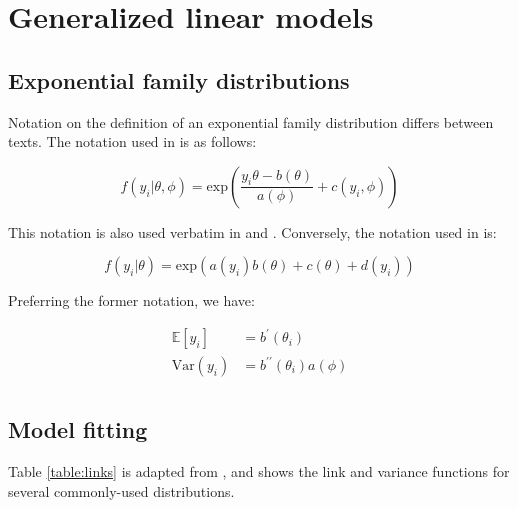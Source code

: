 \documentclass{report}
\begin{document}
\section{Generalized linear models}\label{sec:tools-glm}

\subsection{Exponential family distributions} \label{sec:exponential-family-glms}

Notation on the definition of an exponential family distribution differs between texts. The notation used in \cite{faraway_extending_2016} is as follows:

\begin{equation}\label{eq:glm-exp-fam-dist-1}
    f(y_i|\theta, \phi) = \text{exp}\left(\frac{y_i\theta - b(\theta)}{a(\phi)} + c(y_i, \phi)\right)
\end{equation}

This notation is also used verbatim in \cite{agresti_foundations_2015} and \cite{hardin_generalized_2018}. Conversely, the notation used in \cite{dobson_introduction_2018} is:

\begin{equation}\label{eq:glm-exp-fam-dist-2}
    f(y_i|\theta) = \text{exp}\left(a(y_i)b(\theta) + c(\theta) + d(y_i)\right)
\end{equation}

Preferring the former notation, we have:

\begin{equation}\label{eq:glm-exp-fam-dist-properties}
    \begin{aligned}
        \mathbb{E}[y_i] &= b^\prime(\theta_i) \\
        \text{Var}(y_i) &= b^{\prime\prime}(\theta_i)a(\phi) \\
    \end{aligned}
\end{equation}

\subsection{Model fitting}

Table \ref{table:links} is adapted from \cite[Chapter~8.1-2]{faraway_extending_2016}, and shows the link and variance functions for several commonly-used distributions.  
\end{document}
